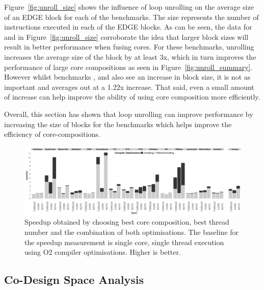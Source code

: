 Figure~\ref{fig:unroll_size} shows the influence of loop unrolling on the average size of an EDGE block for each of the benchmarks.
The size represents the number of instructions executed in each of the EDGE blocks.
As can be seen, the data for  and  in Figure~\ref{fig:unroll_size} corroborate the idea that larger block sizes will result in better performance when fusing cores.
For these benchmarks, unrolling increases the average size of the block by at least 3x, which in turn improves the performance of large core compositions as seen in Figure~\ref{fig:unroll_summary}.
However whilst benchmarks ,  and  also see an increase in block size, it is not as important and averages out at a 1.22x increase.
That said, even a small amount of increase can help improve the ability of using core composition more efficiently.

Overall, this section has shown that loop unrolling can improve performance by increasing the size of blocks for the benchmarks which helps improve the efficiency of core-compositions.

\begin{figure}[t]%
    \includegraphics[width=1\linewidth,keepaspectratio]{streamit-paper/graphics/threadcompbench.pdf}
    \caption{Speedup obtained by choosing best core composition, best
      thread number and the combination of both optimisations. The baseline for the speedup measurement is single core, single thread execution using O2 compiler optimisations. Higher
      is better.}\label{fig:overviewhist}
\end{figure}
\subsection{Co-Design Space Analysis}


